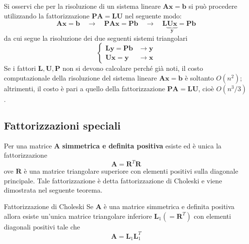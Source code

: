 Si osservi che per la risoluzione di un sistema lineare $\mathbf{Ax}=\mathbf{b}$ si può procedere
utilizzando la fattorizzazione $\mathbf{PA}=\mathbf{LU}$ nel seguente modo:
\[\mathbf{Ax}=\mathbf{b}\quad\to\quad\mathbf{PAx}=\mathbf{Pb}\quad\to\quad\mathbf{L\underbrace
{\mathbf{Ux}}_y}=\mathbf{Pb}\]
da cui segue la risoluzione dei due seguenti sistemi triangolari
\[\begin{cases}
    \mathbf{Ly}=\mathbf{Pb} &\to \mathbf{y} \\
    \mathbf{Ux}=\mathbf{y} &\to \mathbf{x}
\end{cases}\]
Se i fattori $\mathbf{L},\mathbf{U},\mathbf{P}$ non si devono calcolare perché già noti, il costo
computazionale della risoluzione del sistema lineare $\mathbf{Ax}=\mathbf{b}$ è soltanto $O(n^2)$;
altrimenti, il costo è pari a quello della fattorizzazione $\mathbf{PA}=\mathbf{LU}$, cioè $O(n^3/3)$.

\subsection{Fattorizzazioni speciali}

Per una matrice $\mathbf{A}$ \textbf{simmetrica e definita positiva} esiste ed è unica la fattorizzazione
\[\mathbf{A}=\mathbf{R}^T\mathbf{R}\]
ove $\mathbf{R}$ è una matrice triangolare superiore con elementi positivi sulla diagonale principale.
Tale fattorizzazione è detta fattorizzazione di Choleski e viene dimostrata nel seguente teorema.
\begin{theorem}{Fattorizzazione di Choleski}
    Se $\mathbf{A}$ è una matrice simmetrica e definita positiva allora esiste un'unica matrice
    triangolare inferiore $\mathbf{L}_1(=\mathbf{R}^T)$ con elementi diagonali positivi tale che
    \[\mathbf{A}=\mathbf{L}_1\mathbf{L}_1^T\]
\end{theorem}

